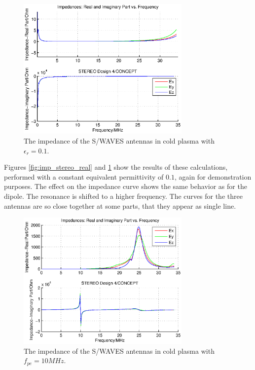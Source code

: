 \documentclass[draft,ras]{agutex}
\begin{document}
\begin{article}
\begin{figure}
\noindent\includegraphics[width=20pc]{impedance_stereo_pl.eps}
  \caption{The impedance of the S/WAVES antennas in cold plasma with $\epsilon_r=0.1$.}\label{fig:imp_stereo_imag}
\end{figure}

Figures \ref{fig:imp_stereo_real} and \ref{fig:imp_stereo_imag} show the results of these calculations, performed with a constant equivalent permittivity of $0.1$, again for demonstration purposes. The effect on the impedance curve shows the same behavior as for the dipole. The resonance is shifted to a higher frequency. The curves for the three antennas are so close together at some parts, that they appear as single line.\\

\begin{figure}
\noindent\includegraphics[width=20pc]{impedance_stereo_pl_fix.eps}
  \caption{The impedance of the S/WAVES antennas in cold plasma with $f_{pe}=10MHz$.}\label{fig:imp_stereo_fix}
\end{figure}


\end{article}
\end{document}
